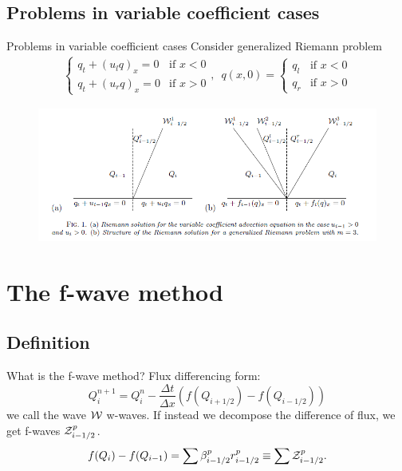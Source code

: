 \documentclass{beamer}
\begin{document}
\subsection{Problems in variable coefficient cases}
\begin{frame}{Problems in variable coefficient cases}
Consider generalized Riemann problem
\begin{align*}
	\begin{cases}q_t+(u_l q)_x=0 & \text{if } x<0 \\
	q_t+(u_r q)_x=0 & \text{if } x>0\end{cases}, \,\,\,
	q(x,0)=\begin{cases}q_l & \text{if } x<0 \\
	q_r & \text{if } x>0\end{cases}
\end{align*}
\begin{figure}
  \centering
  \includegraphics[width=\textwidth]{discon.png}\\
\end{figure}
\cite[p. 960]{bale2002}
\end{frame}

\section{The f-wave method}
\subsection{Definition}
\begin{frame}{What is the f-wave method?}
Flux differencing form:
\[
Q^{n+1}_i=Q^n_i-\frac{\Delta t}{\Delta x}\left( f(Q_{i+1/2})-f(Q_{i-1/2})\right)
\]
we call the wave ${\cal W}$ w-waves. If instead we decompose the difference of flux, we get f-waves ${\cal Z}^p_{i-1/2}$.
\begin{align*}
f(Q_i)-f(Q_{i-1})=\sum \beta^p_{i-1/2} r^p_{i-1/2}\equiv \sum {\cal Z}^p_{i-1/2}.
\end{align*}
\end{frame}
\end{document}
